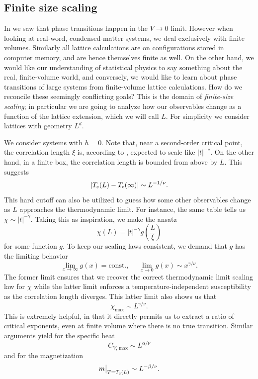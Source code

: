 \subsection{Finite size scaling}

In  we saw that phase transitions happen in the $V\to0$
limit. However when looking at real-word, condensed-matter systems, we deal
exclusively with finite volumes. Similarly all lattice calculations are on
configurations stored in computer memory, and are hence themselves finite as
well. On the other hand, we would like our understanding of statistical physics
to say something about the real, finite-volume world, and conversely, we would
like to learn about phase transitions of large systems from finite-volume
lattice calculations. How do we reconcile these seemingly conflicting goals?
This is the domain of {\it finite-size scaling}; in particular we are going to analyze
how our observables change as a function of the lattice extension, which we will
call $L$. For simplicity we consider lattices with geometry $L^d$.

We consider systems with $h=0$. 
Note that, near a second-order critical point, the correlation
length $\xi$ is, according to , expected to scale like
$|t|^{-\nu}$. On the other hand, in a finite box, the correlation length is bounded
from above by $L$. This suggests
\begin{equation}\label{eq:fssnu}
    |T_{\rm c}(L)-T_{\rm c}(\infty)|\sim L^{-1/\nu}.
\end{equation}
This hard cutoff can also be utilized to guess how some other observables
change as $L$ approaches the thermodynamic limit. For instance, the same
table tells us $\chi\sim|t|^{-\gamma}$. Taking this as inspiration, we
make the ansatz
\begin{equation}
    \chi(L)=|t|^{-\gamma}g\left(\frac{L}{\xi}\right)
\end{equation}
for some function $g$. To keep our scaling laws consistent, we demand that 
$g$ has the limiting behavior
\begin{equation}
    \lim_{x\to\infty}g(x)=\text{const.},~~~~~~\lim_{x\to0}g(x)\sim x^{\gamma/\nu}.
\end{equation}
The former limit ensures that we recover the correct thermodynamic limit scaling law
for $\chi$ while the latter limit enforces a temperature-independent susceptibility
as the correlation length diverges. This latter limit also shows us that
\begin{equation}\label{eq:fss_susc_2nd}
    \chi_{\text{max}}\sim L^{\gamma/\nu}.
\end{equation}
This is extremely helpful, in that it directly permits us to extract a ratio of
critical exponents, even at finite volume where there is no true transition.
Similar arguments yield for the specific heat
\begin{equation}\label{eq:fss_CV}
    C_{V,\,\text{max}}\sim L^{\alpha/\nu}
\end{equation}
and for the magnetization
\begin{equation}\label{eq:fss_M}
    m\big|_{T=T_{\rm c}(L)}\sim L^{-\beta/\nu}.
\end{equation}


